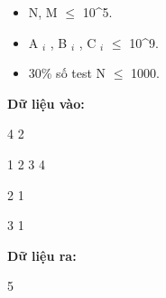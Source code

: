 \begin{itemize}
	\item     N, M  $\le$  10^5.   
	\item     A    $_     i    $    , B    $_     i    $    , C    $_     i    $     $\le$  10^9.   
	\item     30\% số test N  $\le$  1000.   
\end{itemize}
\textbf{    Dữ liệu vào:   }

   4 2  

   1 2 3 4  

   2 1  

   3 1  

\textbf{    Dữ liệu ra:   }

   5